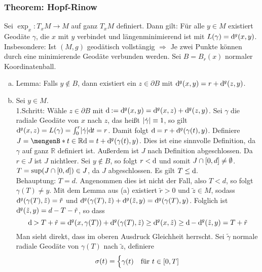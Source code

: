 \subsubsection{Theorem: Hopf-Rinow}
\label{ssub:253}
Sei $\exp_x : T_x M\to M$ auf ganz $T_x M$ definiert. Dann gilt: Für alle $y\in M$ existiert Geodäte $\gamma$, die $x$ mit $y$ verbindet und längenminimierend ist mit $L(\gamma) = \mathrm{d}\mkern-1.0mu^g(x,y)$.\\
Insbesondere: Ist $(M,g)$ geodätisch vollstängig $\Rightarrow$ Je zwei Punkte können durch eine minimierende Geodäte verbunden werden.
Sei $B = B_r(x)$ normaler Koordinatenball.
\begin{enumerate}[(a)]
\item Lemma: Falls $y\not\in B$, dann existiert ein $z\in \partial B$ mit $\mathrm{d}\mkern-1.0mu^g(x,y) = r + \mathrm{d}\mkern-1.0mu^g(z,y)$.
\item Sei $y\in M$.\\
1.Schritt: Wähle $z\in \partial B$ mit $\mathrm{d}\mkern-1.0mu:= \mathrm{d}\mkern-1.0mu^g (x,y) = \mathrm{d}\mkern-1.0mu^g(x,z) + \mathrm{d}\mkern-1.0mu^g(z,y)$. Sei $\gamma$ die radiale Geodäte von $x$ nach $z$, das heißt $\lvert\dot{\gamma}\rvert \equiv 1$, so gilt $\mathrm{d}\mkern-1.0mu^g(x,z) = L(\gamma) = \int_0^r \lvert\dot{\gamma}\rvert\mathrm{d}\mkern-1.0mu t = r$. Damit folgt $\mathrm{d}\mkern-1.0mu = r + \mathrm{d}\mkern-1.0mu^g(\gamma(t),y)$. Definiere $J = \set[t\in \mathds{R}]{\mathd = t + \mathd^g(\gamma(t),y)}$. Dies ist eine sinnvolle Definition, da $\gamma$ auf ganz $\mathds{R}$ definiert ist. Außerdem ist $J$ nach Definition abgeschlossen. Da $r\in J$ ist $J$ nichtleer. Sei $y\not \in B$, so folgt $r<\mathrm{d}\mkern-1.0mu$ und somit $J\cap [0,d] \neq \emptyset$. $T = \sup (J\cap [0,d]) \in J$, da $J$ abgeschlossen. Es gilt $T\leq \mathrm{d}\mkern-1.0mu$.\\
Behauptung: $T = d$. Angenommen dies ist nicht der Fall, also $T < d$, so folgt $\gamma(T)\neq y$. Mit dem Lemma aus (a) existiert $\tilde{r} > 0$ und $\tilde{z}\in M$, sodass $\mathrm{d}\mkern-1.0mu^g(\gamma(T),\tilde{z}) = \tilde{r}$ und $\mathrm{d}\mkern-1.0mu^g (\gamma(T),\tilde{z}) + \mathrm{d}\mkern-1.0mu^g(\tilde{z}, y) = \mathrm{d}\mkern-1.0mu^g (\gamma(T),y)$. Folglich ist $\mathrm{d}\mkern-1.0mu^g(\tilde{z}, y) = d - T -\tilde{r}$, so dass 
\[
\mathrm{d}\mkern-1.0mu > T +\tilde{r} = \mathrm{d}\mkern-1.0mu^g(x,\gamma(T)) + \mathrm{d}\mkern-1.0mu^g(\gamma(T),\tilde{z}) \geq \mathrm{d}\mkern-1.0mu^g(x,\tilde{z}) \geq \mathrm{d}\mkern-1.0mu - \mathrm{d}\mkern-1.0mu^g(\tilde{z},y) = T+\tilde{r}
\]
Man sieht direkt, dass im oberen Ausdruck Gleichheit herrscht. Sei $\tilde{\gamma}$ normale radiale Geodäte von $\gamma(T)$ nach $\tilde{z}$, definiere
\[
\sigma(t) = 
\begin{cases}
\gamma(t) &\text{für}\ t\in [0,T]\\

\end{cases}\]
\end{enumerate}
